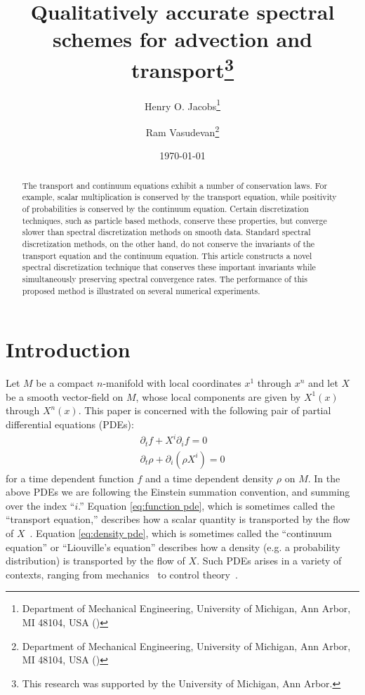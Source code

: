 \documentclass[final,leqno]{siamart}
\title{Qualitatively accurate spectral schemes for advection and transport\thanks{This research was supported by the University of Michigan, Ann Arbor.}}
\author{
    Henry O. Jacobs\thanks{Department of Mechanical Engineering, University of Michigan, Ann Arbor, MI 48104, USA (\email{hojacobs@umich.edu})}
    \and
    Ram Vasudevan\thanks{Department of Mechanical Engineering, University of Michigan, Ann Arbor, MI 48104, USA (\email{ramv@umich.edu}) }
}
\date{\today}
\begin{document}
\maketitle

\begin{abstract}
	The transport and continuum equations exhibit a number of conservation laws.
	For example, scalar multiplication is conserved by the transport equation, while
	positivity of probabilities is conserved by the continuum equation.
	Certain discretization techniques, such as particle based methods, conserve these properties, but converge slower than spectral discretization methods on smooth data.
	Standard spectral discretization methods, on the other hand, do not conserve the invariants of the transport equation and the continuum equation.
	This article constructs a novel spectral discretization technique that conserves these important invariants while simultaneously preserving spectral convergence rates. 
	The performance of this proposed method is illustrated on several numerical experiments. 
\end{abstract}

\section{Introduction}
\label{sec:intro}

Let $M$ be a compact $n$-manifold with local coordinates $x^{1}$ through $x^{n}$
and let $X$ be a smooth vector-field on $M$, whose local components are given by $X^{1}(x)$ through $X^{n}(x)$. 
This paper is concerned with the following pair of partial differential equations (PDEs):
\begin{align}
	\partial_{t} f + X^{i} \partial_{i} f = 0 \label{eq:function pde} \\
	\partial_{t} \rho + \partial_{i} (\rho X^{i}) = 0 \label{eq:density pde}
\end{align}
for a time dependent function $f$ and a time dependent density $\rho$ on $M$.
In the above PDEs we are following the Einstein summation convention, and summing over the index ``$i$.''
Equation \eqref{eq:function pde}, which is sometimes called the ``transport equation,'' describes how a scalar quantity is transported by the flow of $X$~\cite{Truesdell1991}.
Equation \eqref{eq:density pde}, which is sometimes called the ``continuum equation'' or ``Liouville's equation'' describes how a density (e.g. a probability distribution) is transported by the flow of $X$.
Such PDEs arises in a variety of contexts, ranging from  mechanics~\cite{Truesdell1991} to control theory~\cite{HenrionKorda2014}.
\end{document}
